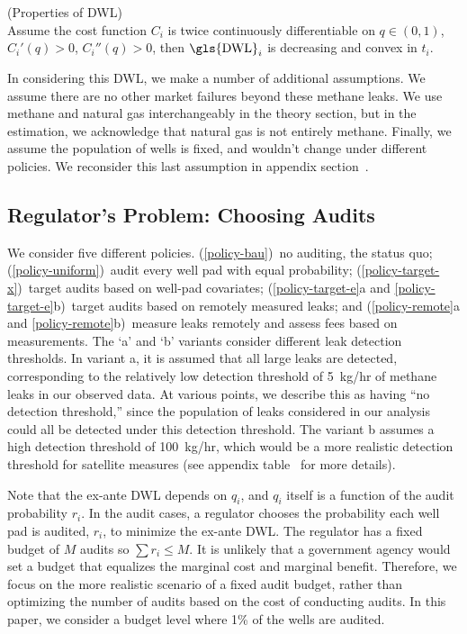 \begin{proposition}{(Properties of \gls{DWL})}
\label{prop_properties_of_dwl}\\
Assume the cost function \(C_i\) is twice continuously differentiable on
\(q \in (0, 1)\), \(C_i'(q) > 0\), \(C_i''(q) > 0\),
then \(\text{\gls{DWL}}_i\) is decreasing and convex in \(t_i\).
\end{proposition}


In considering this \gls{DWL}, we make a number of additional assumptions.
We assume there are no other market failures beyond these methane leaks.
We use methane and natural gas interchangeably in the theory section, but in the estimation, we acknowledge that natural gas is not entirely methane.
Finally, we assume the population of wells is fixed, and wouldn't change under different policies.
We reconsider this last assumption in appendix section~\iftoggle{usexr}{\ref{app:drilling-response-details}}{A5}.



\subsection{Regulator's Problem: Choosing Audits}
\label{sec:regulator-problem-choosing-audits}



We consider five different policies.
(\ref{policy-bau})~no auditing, the status quo;
(\ref{policy-uniform})~audit every well pad with equal probability;
(\ref{policy-target-x})~target audits based on well-pad covariates;
(\ref{policy-target-e}a and \ref{policy-target-e}b)~target audits based on remotely measured leaks; and
(\ref{policy-remote}a and \ref{policy-remote}b)~measure leaks remotely and assess fees based on measurements.
The `a' and `b' variants consider different leak detection thresholds.
In variant a, it is assumed that all large leaks are detected, corresponding to the relatively low detection threshold of 5~kg/hr of methane leaks in our observed data.
At various points, we describe this as having ``no detection threshold,'' since the population of leaks considered in our analysis could all be detected under this detection threshold.
The variant b assumes a high detection threshold of 100~kg/hr, which would be a more realistic detection threshold for satellite measures
(see appendix table~\iftoggle{usexr}{\ref{tab:satellite-detection-threshold}}{A1} for more details).

Note that the ex-ante \gls{DWL} depends on \(q_i\), and \(q_i\) itself is a function of the audit probability \(r_i\).
In the audit cases, a regulator chooses the probability each well pad is audited, \(r_i\),
to minimize the ex-ante \gls{DWL}.
The regulator has a fixed budget of \(M\) audits so \(\sum r_i \leq M\).
It is unlikely that a government agency would set a budget that equalizes the marginal cost and marginal benefit.
Therefore, we focus on the more realistic scenario of a fixed audit budget, rather than optimizing the number of audits based on the cost of conducting audits.
In this paper, we consider a budget level where 1\% of the wells are audited.


